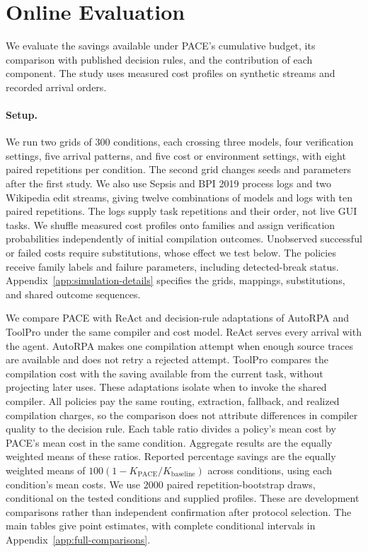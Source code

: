 \section{Online Evaluation}
\label{sec:eval}

We evaluate the savings available under PACE's cumulative budget, its comparison with published decision rules, and the contribution of each component.
The study uses measured cost profiles on synthetic streams and recorded arrival orders.

\paragraph{Setup.}
We run two grids of $300$ conditions, each crossing three models, four verification settings, five arrival patterns, and five cost or environment settings, with eight paired repetitions per condition.
The second grid changes seeds and parameters after the first study.
We also use Sepsis and BPI 2019 process logs \citep{mannhardt2016sepsis,vandongen2019bpi} and two Wikipedia edit streams, giving twelve combinations of models and logs with ten paired repetitions.
The logs supply task repetitions and their order, not live GUI tasks.
We shuffle measured cost profiles onto families and assign verification probabilities independently of initial compilation outcomes.
Unobserved successful or failed costs require substitutions, whose effect we test below.
The policies receive family labels and failure parameters, including detected-break status.
Appendix~\ref{app:simulation-details} specifies the grids, mappings, substitutions, and shared outcome sequences.

We compare PACE with ReAct \citep{yao2023react} and decision-rule adaptations of AutoRPA \citep{chen2026autorpa} and ToolPro \citep{liu2026toolpro} under the same compiler and cost model.
ReAct serves every arrival with the agent.
AutoRPA makes one compilation attempt when enough source traces are available and does not retry a rejected attempt.
ToolPro compares the compilation cost with the saving available from the current task, without projecting later uses.
These adaptations isolate when to invoke the shared compiler.
All policies pay the same routing, extraction, fallback, and realized compilation charges, so the comparison does not attribute differences in compiler quality to the decision rule.
Each table ratio divides a policy's mean cost by PACE's mean cost in the same condition.
Aggregate results are the equally weighted means of these ratios.
Reported percentage savings are the equally weighted means of $100(1-K_{\mathrm{PACE}}/K_{\mathrm{baseline}})$ across conditions, using each condition's mean costs.
We use $2000$ paired repetition-bootstrap draws, conditional on the tested conditions and supplied profiles.
These are development comparisons rather than independent confirmation after protocol selection.
The main tables give point estimates, with complete conditional intervals in Appendix~\ref{app:full-comparisons}.

